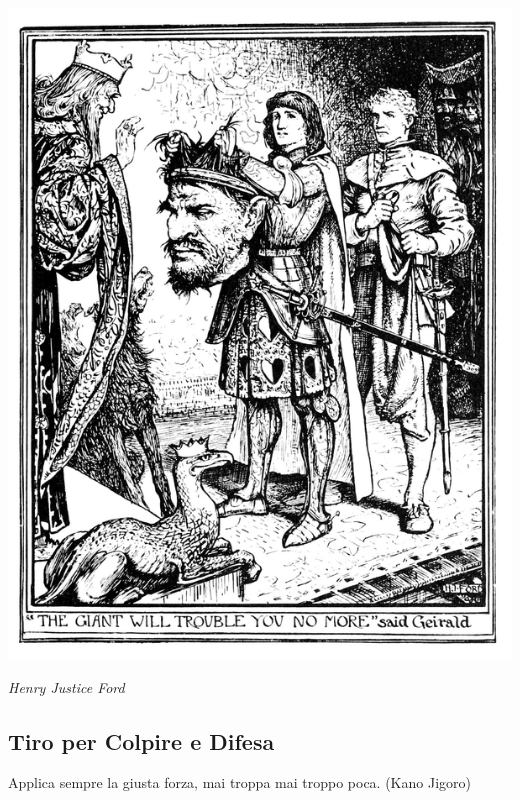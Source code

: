 \vfill

\begin{center}


\includegraphics[width=0.45\linewidth]{immagini/giantdeath.png}

\emph{Henry Justice Ford}

\end{center}

\pagebreak

\subsection{Tiro per Colpire e Difesa}\label{tiropercolpireedifesa}\hypertarget{tiropercolpireedifesa}{}

\begin{changemargin}{0.3cm}{0.3cm}\begin{enfasi}{Applica sempre la giusta forza, mai troppa mai troppo poca. (Kano Jigoro)}\end{enfasi}\end{changemargin}\medskip

